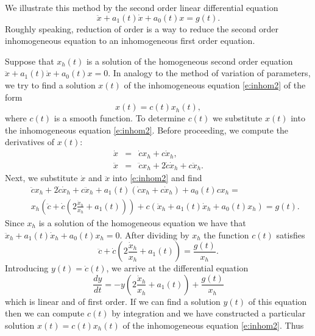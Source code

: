 \documentclass{ximera}
\begin{document}
We illustrate this method by the second order linear differential 
equation
\begin{equation}  \label{e:inhom2}
\ddot{x} + a_1(t)\dot{x} + a_0(t)x = g(t).
\end{equation}
Roughly speaking, reduction of order is a way to reduce the second order 
inhomogeneous equation to an inhomogeneous first order equation.

Suppose that $x_h(t)$ is a solution of the 
homogeneous second order equation
$\ddot{x} + a_1(t)\dot{x} + a_0(t)x = 0$.  
In analogy to the method of variation of
parameters, we try to find a solution $x(t)$ of the 
inhomogeneous equation
\eqref{e:inhom2} of the form
\[
x(t) = c(t) x_h(t),
\]
where $c(t)$ is a smooth function.  To determine $c(t)$ we substitute $x(t)$
into the inhomogeneous equation \eqref{e:inhom2}.  Before proceeding, we
compute the derivatives of $x(t)$:
\begin{eqnarray*}
\dot x  & = & \dot c x_h + c \dot{x}_h,\\
\ddot x & = & \ddot c x_h + 2 \dot c \dot{x}_h + c \ddot{x}_h.
\end{eqnarray*}
Next, we substitute $\dot{x}$ and $\ddot{x}$ into \eqref{e:inhom2} and find
\begin{eqnarray*}
&& \ddot c x_h +2\dot c \dot{x}_h + c \ddot{x}_h +
a_1(t)\left(\dot c x_h + c \dot{x}_h \right)+ a_0(t) c x_h =\\
&& x_h \left(\ddot c + \dot c(2 \frac{\dot{x}_h}{x_h} + a_1(t))\right) +
 c(\ddot{x}_h +a_1(t) \dot{x}_h +a_0(t) x_h) = g(t).
\end{eqnarray*}
Since $x_h$ is a solution of the homogeneous equation we have that
$\ddot{x}_h +a_1(t) \dot{x}_h +a_0(t)x_h=0$. After dividing by $x_h$ the function
$c(t)$ satisfies
\[
\ddot c + \dot c\left( 2\frac{\dot{x}_h}{x_h} +a_1(t)\right) = \frac{g(t)}{x_h}.
\]
Introducing $y(t)=\dot c(t)$, we arrive at the differential equation
\[
\frac{dy}{dt} = -y\left( 2\frac{\dot{x}_h}{x_h} +a_1(t)\right) + \frac{g(t)}{x_h}
\]
which is linear and of first order.  If we can find a solution
$y(t)$ of this equation then we can compute $c(t)$ by integration
and we have constructed a 
particular solution 
$x(t)=c(t)x_h(t)$ of the
inhomogeneous equation \eqref{e:inhom2}. Thus
\end{document}

